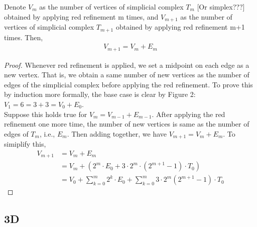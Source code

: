     \begin{lemma}
    Denote $V_{m}$ as the number of vertices of simplicial complex $T_m$ [Or simplex???] obtained by applying red refinement m times, and $V_{m+1}$ as the number of vertices of simplicial complex $T_{m+1}$ obtained by applying red refinement m+1 times. Then,
    \begin{align*}
    V_{m+1} = V_{m} + E_{m}
    \end{align*}
    \end{lemma}
    \begin{proof}
    Whenever red refinement is applied, we set a midpoint on each edge as a new vertex. That is, we obtain a same number of new vertices as the number of edges of the simplicial complex before applying the red refinement. To prove this by induction more formally, the base case is clear by Figure 2: $V_1 = 6 = 3 + 3 = V_0 + E_0$.\\
    Suppose this holds true for $V_{m} = V_{m-1} + E_{m-1}$. After applying the red refinement one more time, the number of new vertices is same as the number of edges of $T_m$, i.e., $E_m$. Then adding together, we have $V_{m+1} = V_m + E_m$. To simiplify this,
    \begin{align*}
    V_{m+1} &= V_m + E_m\\
    &= V_m + (2^m\cdot E_0 + 3\cdot2^m\cdot(2^{m+1}-1)\cdot T_0)\\
    &= V_0 + \sum_{k = 0}^{m}2^k\cdot E_0 + \sum_{k=0}^{m} 3\cdot 2^m(2^{m+1} - 1)\cdot T_0
    \end{align*}
    \end{proof}


    \subsection{3D}